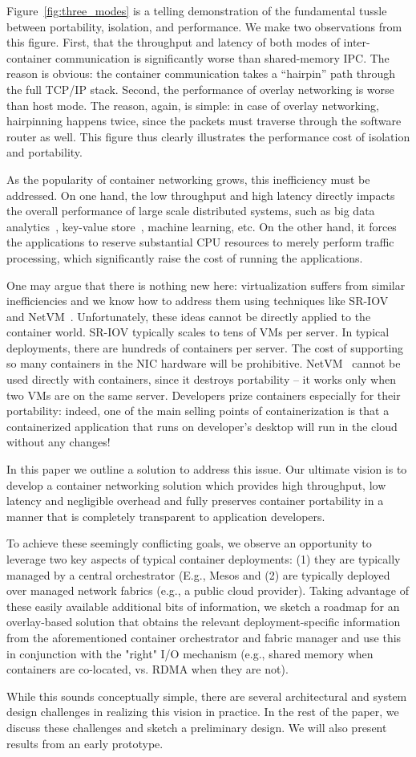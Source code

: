 Figure~\ref{fig:three_modes} is a telling demonstration of the fundamental
tussle between portability, isolation, and performance. We make two
observations from this figure. First, that the throughput and latency of both
modes of inter-container communication is significantly worse than
shared-memory IPC. The reason is obvious: the container communication takes a
``hairpin'' path through the full TCP/IP stack. Second, the performance of
overlay networking is worse than host mode. The reason, again, is simple: in
case of overlay networking, hairpinning happens twice, since the packets must
traverse through the software router as well. This figure thus clearly
illustrates the performance cost of isolation and portability.

As the popularity of container networking grows, this inefficiency must be
addressed. On one hand, the low throughput and high latency directly impacts the
overall performance of large scale distributed systems, such as big data
analytics~\cite{choudhury-paper,mapreduce}, key-value
store~\cite{farm,cassandra,bigtable}, machine learning, etc.  On the other hand,
it forces the applications to reserve substantial CPU resources to merely
perform traffic processing, which significantly raise the cost of running the
applications.

One may argue that there is nothing new here: virtualization suffers from
similar inefficiencies and we know how to address them using techniques like
SR-IOV~\cite{sriov} and NetVM~\cite{netvm}. Unfortunately, these ideas cannot be
directly applied to the container world.  SR-IOV typically scales to tens of VMs
per server. In typical deployments, there are hundreds of containers per server.
The cost of supporting so many containers in the NIC hardware will be
prohibitive.  NetVM~\cite{netvm} cannot be used directly with containers, since
it destroys portability -- it works only when two VMs are on the same server.
Developers prize containers especially for their portability: indeed, one of the
main selling points of containerization is that a containerized application that
runs on developer's desktop will run in the cloud without any changes! 

In this paper we outline a solution to address this issue.  Our ultimate vision
is to develop a container networking solution which provides high throughput,
low latency and negligible overhead and fully preserves container portability in
a manner that is completely transparent to application developers. 

To achieve these seemingly conflicting goals, we observe an opportunity to
leverage two key aspects of typical container deployments: (1) they are
typically managed by a central orchestrator (E.g., Mesos
\cite{mesos,kubernetes,xxx} and (2) are typically deployed over managed network
fabrics (e.g., a public cloud provider). Taking advantage of these easily
available additional bits of information, we sketch a roadmap for an
overlay-based solution  that obtains the relevant deployment-specific
information from the aforementioned container orchestrator and fabric manager
and use this in conjunction with the "right" I/O mechanism (e.g., shared memory
when containers are co-located, vs. RDMA when they are not). 

While this sounds conceptually simple, there are several architectural
and system design challenges in realizing this vision in practice. In the rest
of the paper, we discuss these challenges and sketch a preliminary design. We
will also present results from an early prototype.
